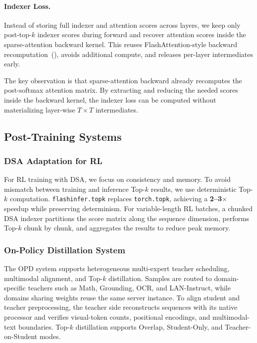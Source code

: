 \documentclass{article} %
\begin{document}
\paragraph{Indexer Loss.}
Instead of storing full indexer and attention scores across layers, we keep only post-top-$k$ indexer scores during forward and recover attention scores inside the sparse-attention backward kernel. This reuses FlashAttention-style backward recomputation~(\cite{flashattention}), avoids additional compute, and releases per-layer intermediates early.

The key observation is that sparse-attention backward already recomputes the post-softmax attention matrix. By extracting and reducing the needed scores inside the backward kernel, the indexer loss can be computed without materializing layer-wise $T \times T$ intermediates.

\subsection{Post-Training Systems}

\subsubsection{DSA Adaptation for RL}

For RL training with DSA, we focus on consistency and memory. To avoid mismatch between training and inference Top-$k$ results, we use deterministic Top-$k$ computation. \texttt{flashinfer.topk} replaces \texttt{torch.topk}, achieving a \textbf{2--3$\times$} speedup while preserving determinism. For variable-length RL batches, a chunked DSA indexer partitions the score matrix along the sequence dimension, performs Top-$k$ chunk by chunk, and aggregates the results to reduce peak memory.

\subsubsection{On-Policy Distillation System}

The OPD system supports heterogeneous multi-expert teacher scheduling, multimodal alignment, and Top-$k$ distillation. Samples are routed to domain-specific teachers such as Math, Grounding, OCR, and LAN-Instruct, while domains sharing weights reuse the same server instance. To align student and teacher preprocessing, the teacher side reconstructs sequences with its native processor and verifies visual-token counts, positional encodings, and multimodal-text boundaries. Top-$k$ distillation supports Overlap, Student-Only, and Teacher-on-Student modes.
\end{document}
